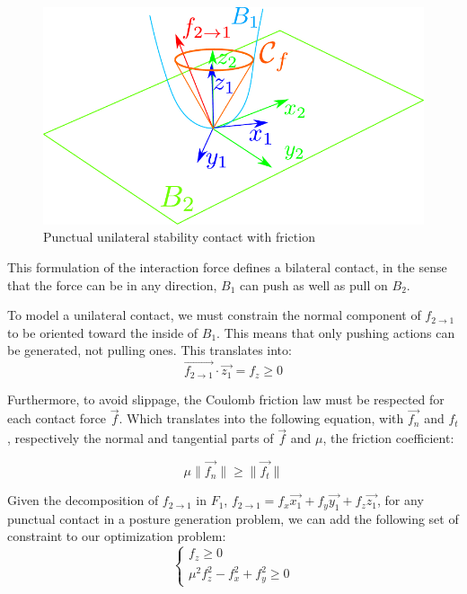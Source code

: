 \begin{figure}[htpb]
  \centering
  \includegraphics[width=0.6\linewidth]{frictionCone.pdf}
  \caption{Punctual unilateral stability contact with friction}
\label{fig:frictionCone}
\end{figure}

This formulation of the interaction force defines a bilateral contact, in the sense that the force can be in any direction, $B_1$ can push as well as pull on $B_2$.

To model a unilateral contact, we must constrain the normal component of $f_{2\rightarrow 1}$ to be oriented toward the inside of $B_1$.
This means that only pushing actions can be generated, not pulling ones.
This translates into:
\begin{equation}
  \overrightarrow{f_{2\rightarrow 1}}\cdot \vec{z_1} = f_z \geq 0
\end{equation}

Furthermore, to avoid slippage, the Coulomb friction law must be respected for each contact force $\vec{f}$.
Which translates into the following equation, with $\vec{f_n}$ and $f_t$, respectively the normal and tangential parts of $\vec{f}$ and $\mu$, the friction coefficient:

\begin{equation}
  \mu\|\vec{f_n}\| \geq \|\vec{f_t}\|
\end{equation}

Given the decomposition of $f_{2\rightarrow 1}$ in $F_1$, $f_{2\rightarrow 1} = f_x \vec{x_1} + f_y \vec{y_1} + f_z \vec{z_1}$, for any punctual contact in a posture generation problem, we can add the following set of constraint to our optimization problem:
\begin{equation}
  \label{eq:unilateralContact}
  \left\{
  \begin{array}{l}
    f_z \geq 0 \\
    \mu^2 f_z^2 - f_x^2 +f_y^2 \geq 0
  \end{array}
  \right.
\end{equation}

